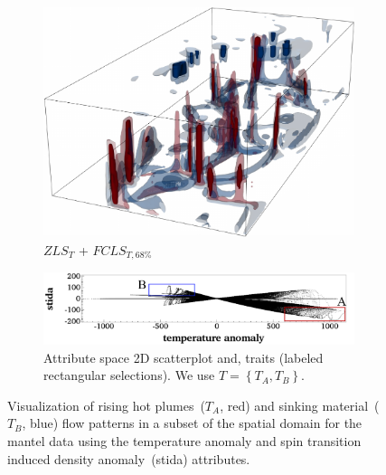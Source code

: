 \begin{figure}[!h]
\begin{subfigure}{0.23\linewidth}
\includegraphics[width=\linewidth]{Images/Mantel/fcls_68.pdf}
\vspace{-5mm}
\caption{$ZLS_{T}$ + $FCLS_{T,68\%}$}
\label{fig:mantel_fcls}
\end{subfigure}
\hfill
\begin{subfigure}{0.28\linewidth}
\centering
\includegraphics[width=\linewidth]{Images/Mantel/scatterplot.pdf}
\caption{Attribute space 2D scatterplot and, traits (labeled rectangular selections). We use $T = \left\{T_{A}, T_{B}\right\}$.} 
\label{fig:mantel_scatterplot}
\end{subfigure}
\vspace{-3mm}
\caption{Visualization of rising hot plumes~($T_{A}$, red) and sinking material~($T_{B}$, blue) flow patterns in a subset of the spatial domain for the mantel data using the temperature anomaly and spin transition induced density anomaly~(stida) attributes.}
\label{fig:mantel}
\end{figure}
